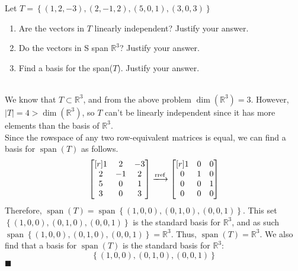 \documentclass{article}
\begin{document}
\newpage
{} Let $T =\left\{(1, 2, -3), (2, -1, 2), (5, 0, 1), (3, 0, 3) \right\}$ 
\begin{enumerate}
\item Are the vectors in $T$ linearly independent? Justify your answer. 
\item Do the vectors in S span $\mathbb{R}^3$? Justify your answer.
\item Find a basis for the span($T$). Justify your answer.
\end{enumerate}
\noindent\makebox[\linewidth]{\rule{\linewidth}{0.4pt}}\\
We know that \(T \subset \mathbb{R} ^3\), and from the above problem \(\dim \left( \mathbb{R} ^3 \right)  =3\). However, \(|T| =4>\dim \left( \mathbb{R} ^3 \right)\), so \(T\) can't be linearly independent since it has more elements than the basis of \(\mathbb{R} ^3\).\\
Since the rowspace of any two row-equivalent matrices is equal, we can find a basis for \(\operatorname{span}(T) \) as follows.
\[
  \begin{bmatrix}[r]
    1 &2  &-3   \\
     2&-1  &2   \\
     5&0  &1   \\
     3&0  &3   \\
  \end{bmatrix}\xlongrightarrow{\text{rref}}\begin{bmatrix}[r]
    1 &0  &0   \\
     0&1  &0   \\
     0&0  &1   \\
     0&0  &0   \\
  \end{bmatrix}
\]
Therefore, \(\operatorname{span}(T)=\operatorname{span}\left\{ (1,0,0),(0,1,0),(0,0,1) \right\}   \). This set \(\left\{ (1,0,0),(0,1,0),(0,0,1) \right\}\) is the standard basis for \(\mathbb{R}^3\), and as such \(\operatorname{span}\left\{ (1,0,0),(0,1,0),(0,0,1) \right\}=\mathbb{R}^3\). Thus, \(\operatorname{span}(T)=\mathbb{R} ^3 \). We also find that a basis for \(\operatorname{span}(T) \) is the standard basis for \(\mathbb{R}^3\):
\[
  \left\{ (1,0,0),(0,1,0),(0,0,1) \right\}
\]\hfill\(\blacksquare\)
\end{document}

